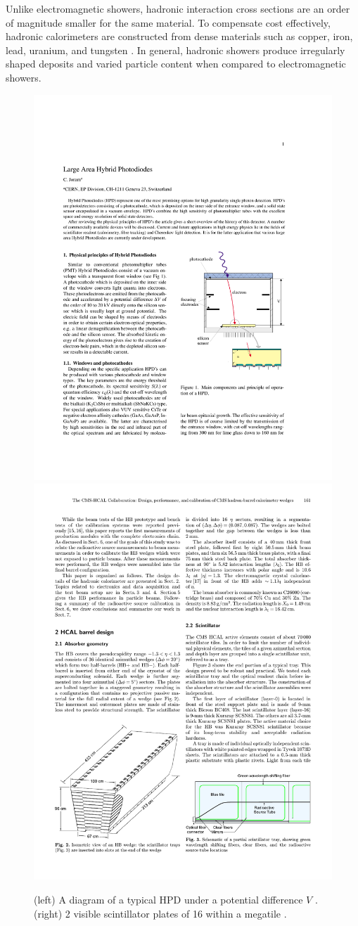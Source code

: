 Unlike electromagnetic showers, hadronic interaction cross sections are an order of magnitude smaller for the same material. To compensate cost effectively, hadronic calorimeters are constructed from dense materials 
such as copper, iron, lead, uranium, and tungsten \cite{tully}. In general, hadronic showers
produce irregularly shaped deposits and varied particle content when compared to electromagnetic showers. 
 
\begin{figure}
\begin{center}
\includegraphics[width=.45\textwidth]{pics/HPD}
\includegraphics[width=.45\textwidth]{pics/HCALfiber}
\end{center}
\caption{(left) A diagram of a typical HPD under a potential difference $V$ \cite{hpd}. (right) 2 visible
 scintillator plates of 16 within a megatile \cite{hcalcalib}.}
\label{fig:hpd_fiber}
\end{figure}

